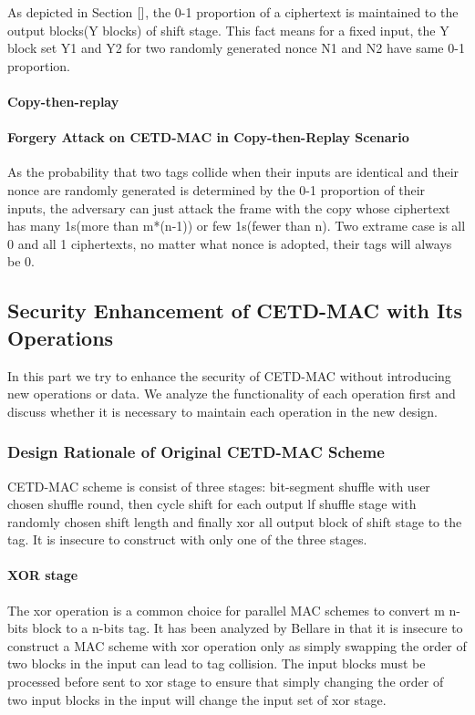 As depicted in Section $\ref{}$, the 0-1 proportion of a ciphertext is maintained to the output blocks(Y blocks) of shift stage. This fact means for a fixed input, the Y block set Y1 and Y2 for two randomly generated nonce N1 and N2 have same 0-1 proportion.  
\paragraph{Copy-then-replay}
\paragraph{Forgery Attack on CETD-MAC in Copy-then-Replay Scenario}
As the probability that two tags collide when their inputs are identical and their nonce are randomly generated is determined by the 0-1 proportion of their inputs, the adversary can just attack the frame with the copy whose ciphertext has many 1s(more than m*(n-1)) or few 1s(fewer than n). Two extrame case is all 0 and all 1 ciphertexts, no matter what nonce is adopted, their tags will always be 0.

\subsection{Security Enhancement of CETD-MAC with Its Operations}
In this part we try to enhance the security of CETD-MAC without introducing new operations or data. We analyze the functionality of each operation first and discuss whether it is necessary to maintain each operation in the new design.
\subsubsection{Design Rationale of Original CETD-MAC Scheme}
CETD-MAC scheme is consist of three stages: bit-segment shuffle with user chosen shuffle round, then cycle shift for each output lf shuffle stage with randomly chosen shift length and finally xor all output block of shift stage to the tag. It is insecure to construct with only one of the three stages.
\paragraph{XOR stage}
The xor operation is a common choice for parallel MAC schemes to convert m n-bits block to a n-bits tag. It has been analyzed by Bellare in \cite{} that it is insecure to construct a MAC scheme with xor operation only as simply swapping the order of two blocks in the input can lead to tag collision.  The input blocks must be processed before sent to xor stage to ensure that simply changing the order of two input blocks in the input will change the input set of xor stage.
